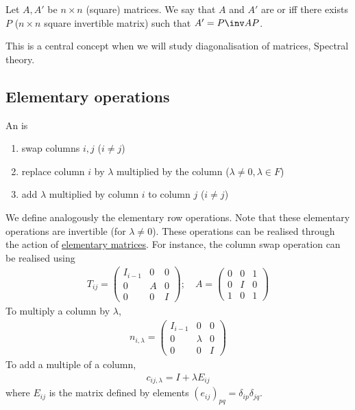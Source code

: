 \begin{definition}
    Let $A, A'$ be $n \times n$ (square) matrices.
    We say that $A$ and $A'$ are  or  iff there exists $P$ ($n \times n$ square invertible matrix) such that $A' = P\inv A P$.
\end{definition} 
This is a central concept when we will study diagonalisation of matrices, Spectral theory.

\subsection{Elementary operations}
\begin{definition}
    An  is
    \begin{enumerate}
        \item swap columns $i, j$ ($i \neq j$)
        \item replace column $i$ by $\lambda$ multiplied by the column ($\lambda \neq 0, \lambda \in F$)
        \item add $\lambda$ multiplied by column $i$ to column $j$ ($i \neq j$)
    \end{enumerate}
\end{definition}
We define analogously the elementary row operations.
Note that these elementary operations are invertible (for $\lambda \neq 0$).
These operations can be realised through the action of \underline{elementary matrices}.
For instance, the column swap operation can be realised using
\begin{align*}
    T_{ij} = \begin{pmatrix}
        I_{i-1} & 0 & 0   \\
        0   & A & 0   \\
        0   & 0 & I
    \end{pmatrix};\quad A = \begin{pmatrix}
        0 & 0   & 1 \\
        0 & I & 0 \\
        1 & 0   & 1
    \end{pmatrix}
\end{align*}
To multiply a column by $\lambda$,
\begin{align*}
    n_{i,\lambda} = \begin{pmatrix}
        I_{i-1} & 0       & 0   \\
        0   & \lambda & 0   \\
        0   & 0       & I
    \end{pmatrix}
\end{align*}
To add a multiple of a column,
\begin{align*}
    c_{ij,\lambda} = I + \lambda E_{ij}
\end{align*}
where $E_{ij}$ is the matrix defined by elements $(e_{ij})_{pq} = \delta_{ip} \delta_{jq}$.

